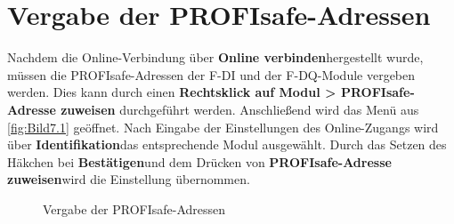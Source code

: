 \section{Vergabe der PROFIsafe-Adressen} \label{sec: vergabe der profisafe-adressen}

Nachdem die Online-Verbindung über \glqq\textbf{Online verbinden}\grqq\:hergestellt wurde, müssen die PROFIsafe-Adressen der F-DI und der F-DQ-Module vergeben werden. Dies kann durch einen \textbf{Rechtsklick auf Modul > PROFIsafe-Adresse zuweisen} durchgeführt werden. Anschließend wird das Menü aus \autoref{fig:Bild7.1} geöffnet. Nach Eingabe der Einstellungen des Online-Zugangs wird über \glqq\textbf{Identifikation}\grqq\:das entsprechende Modul ausgewählt. Durch das Setzen des Häkchen bei \glqq\textbf{Bestätigen}\grqq\:und dem Drücken von \glqq\textbf{PROFIsafe-Adresse zuweisen}\grqq\:wird die Einstellung übernommen.

\begin{figure}[H]
   \centering
   \caption[Vergabe der PROFIsafe-Adressen]{Vergabe der PROFIsafe-Adressen}
   \label{fig:Bild7.1}
\end{figure}